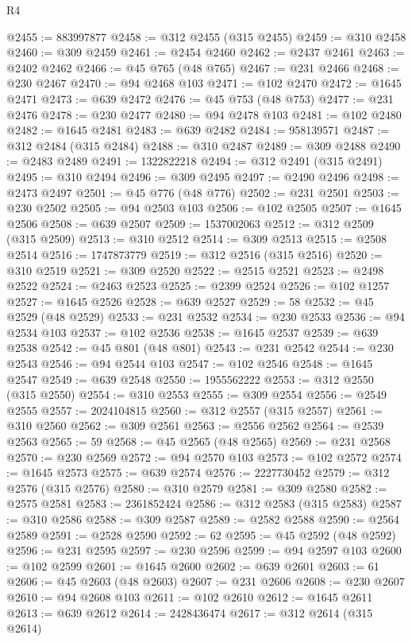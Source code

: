 \begin{lexlean}{R4}
\begin{coremodule}
@2455 := 883997877
@2458 := @312 @2455 (@315 @2455)
@2459 := @310 @2458
@2460 := @309 @2459
@2461 := @2454 @2460
@2462 := @2437 @2461
@2463 := @2402 @2462
@2466 := @45 @765 (@48 @765)
@2467 := @231 @2466
@2468 := @230 @2467
@2470 := @94 @2468 @103
@2471 := @102 @2470
@2472 := @1645 @2471
@2473 := @639 @2472
@2476 := @45 @753 (@48 @753)
@2477 := @231 @2476
@2478 := @230 @2477
@2480 := @94 @2478 @103
@2481 := @102 @2480
@2482 := @1645 @2481
@2483 := @639 @2482
@2484 := 958139571
@2487 := @312 @2484 (@315 @2484)
@2488 := @310 @2487
@2489 := @309 @2488
@2490 := @2483 @2489
@2491 := 1322822218
@2494 := @312 @2491 (@315 @2491)
@2495 := @310 @2494
@2496 := @309 @2495
@2497 := @2490 @2496
@2498 := @2473 @2497
@2501 := @45 @776 (@48 @776)
@2502 := @231 @2501
@2503 := @230 @2502
@2505 := @94 @2503 @103
@2506 := @102 @2505
@2507 := @1645 @2506
@2508 := @639 @2507
@2509 := 1537002063
@2512 := @312 @2509 (@315 @2509)
@2513 := @310 @2512
@2514 := @309 @2513
@2515 := @2508 @2514
@2516 := 1747873779
@2519 := @312 @2516 (@315 @2516)
@2520 := @310 @2519
@2521 := @309 @2520
@2522 := @2515 @2521
@2523 := @2498 @2522
@2524 := @2463 @2523
@2525 := @2399 @2524
@2526 := @102 @1257
@2527 := @1645 @2526
@2528 := @639 @2527
@2529 := 58
@2532 := @45 @2529 (@48 @2529)
@2533 := @231 @2532
@2534 := @230 @2533
@2536 := @94 @2534 @103
@2537 := @102 @2536
@2538 := @1645 @2537
@2539 := @639 @2538
@2542 := @45 @801 (@48 @801)
@2543 := @231 @2542
@2544 := @230 @2543
@2546 := @94 @2544 @103
@2547 := @102 @2546
@2548 := @1645 @2547
@2549 := @639 @2548
@2550 := 1955562222
@2553 := @312 @2550 (@315 @2550)
@2554 := @310 @2553
@2555 := @309 @2554
@2556 := @2549 @2555
@2557 := 2024104815
@2560 := @312 @2557 (@315 @2557)
@2561 := @310 @2560
@2562 := @309 @2561
@2563 := @2556 @2562
@2564 := @2539 @2563
@2565 := 59
@2568 := @45 @2565 (@48 @2565)
@2569 := @231 @2568
@2570 := @230 @2569
@2572 := @94 @2570 @103
@2573 := @102 @2572
@2574 := @1645 @2573
@2575 := @639 @2574
@2576 := 2227730452
@2579 := @312 @2576 (@315 @2576)
@2580 := @310 @2579
@2581 := @309 @2580
@2582 := @2575 @2581
@2583 := 2361852424
@2586 := @312 @2583 (@315 @2583)
@2587 := @310 @2586
@2588 := @309 @2587
@2589 := @2582 @2588
@2590 := @2564 @2589
@2591 := @2528 @2590
@2592 := 62
@2595 := @45 @2592 (@48 @2592)
@2596 := @231 @2595
@2597 := @230 @2596
@2599 := @94 @2597 @103
@2600 := @102 @2599
@2601 := @1645 @2600
@2602 := @639 @2601
@2603 := 61
@2606 := @45 @2603 (@48 @2603)
@2607 := @231 @2606
@2608 := @230 @2607
@2610 := @94 @2608 @103
@2611 := @102 @2610
@2612 := @1645 @2611
@2613 := @639 @2612
@2614 := 2428436474
@2617 := @312 @2614 (@315 @2614)

\end{coremodule}
\end{lexlean}
